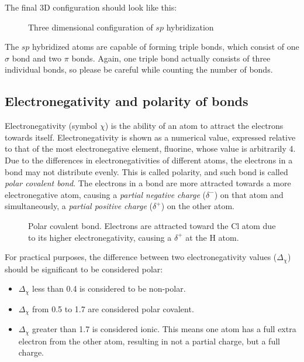 \documentclass{report}
\begin{document}
				The final 3D configuration should look like this:
				\begin{figure}[H]
			\centering
			\captionsetup{justification=centering, margin=2cm}
			\caption{Three dimensional configuration of $sp$ hybridization}
			\end{figure}
			
				The $sp$ hybridized atoms are capable of forming triple bonds, which consist of one $\sigma$ bond and two $\pi$ bonds. Again, one triple bond actually consists of three individual bonds, so please be careful while counting the number of bonds.

		\subsection{Electronegativity and polarity of bonds}
		 Electronegativity (symbol $\chi$) is the ability of an atom to attract the electrons towards itself. Electronegativity is shown as a numerical value, expressed relative to that of the most electronegative element, fluorine, whose value is arbitrarily 4. \\
		 
		 Due to the differences in electronegativities of different atoms, the electrons in a bond may not distribute evenly. This is called polarity, and such bond is called \textit{polar covalent bond}. The electrons in a bond are more attracted towards a more electronegative atom, causing a \textit{partial negative charge} ($\delta^-$) on that atom and simultaneously, a \textit{partial positive charge} ($\delta^+$) on the other atom.
		 \begin{figure}[H]
		 \centering
		 \captionsetup{justification=centering, margin=2cm}
			\caption{Polar covalent bond. Electrons are attracted toward the Cl atom due to its higher electronegativity, causing a $\delta^+$ at the H atom.}
		 \end{figure}
		 
		 For practical purposes, the difference between two electronegativity values ($\Delta_\chi$) should be significant to be considered polar:
		 \begin{itemize}
		 	\item{$\Delta_\chi$ less than 0.4 is considered to be non-polar.}
			\item{$\Delta_\chi$ from 0.5 to 1.7 are considered polar covalent.}
			\item{$\Delta_\chi$ greater than 1.7 is considered ionic. This means one atom has a full extra electron from the other atom, resulting in not a partial charge, but a full charge.}
		 \end{itemize}
		 	
\end{document}
